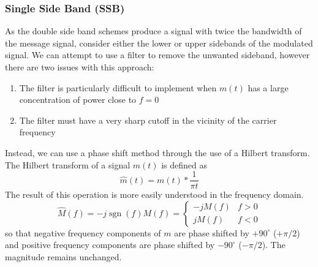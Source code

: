 \documentclass{article}
\DeclareMathOperator{\sgn}{sgn}
\begin{document}
\subsubsection{Single Side Band (SSB)}
As the double side band schemes produce a signal with twice the
bandwidth of the message signal, consider either the lower or upper
sidebands of the modulated signal. We can attempt to use a filter to
remove the unwanted sideband, however there are two issues with this
approach:
\begin{enumerate}
    \item The filter is particularly difficult to implement when
          \(m\left( t \right)\) has a large concentration of power
          close to \(f = 0\)
    \item The filter must have a very sharp cutoff in the vicinity of
          the carrier frequency
\end{enumerate}
Instead, we can use a phase shift method through the use of a Hilbert
transform. The Hilbert transform of a signal \(m\left( t \right)\) is
defined as
\begin{equation*}
    \hat{m}\left( t \right) = m\left( t \right) \ast \frac{1}{\pi t}
\end{equation*}
The result of this operation is more easily understood in the frequency domain.
\begin{equation*}
    \hat{M}\left( f \right) = -j \sgn{\left( f \right)} M\left( f \right) =
    \begin{cases}
        -j M\left( f \right) & f > 0 \\
        j M\left( f \right)  & f < 0
    \end{cases}
\end{equation*}
so that negative frequency components of \(m\) are phase shifted by \(+90^{\circ}\) (\(+\pi/2\)) and
positive frequency components are phase shifted by \(-90^{\circ}\) (\(-\pi/2\)).
The magnitude remains unchanged.
\end{document}
